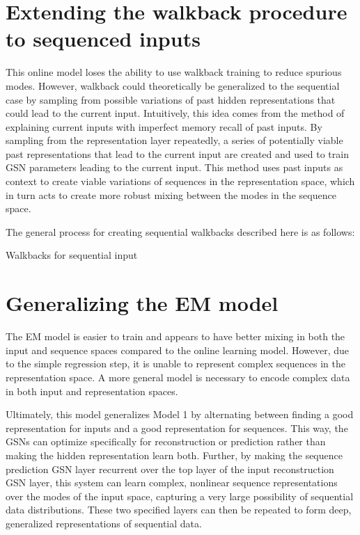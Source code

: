 \section{Extending the walkback procedure to sequenced inputs}

This online model loses the ability to use walkback training to reduce spurious modes. However, walkback could theoretically be generalized to the sequential case by sampling from possible variations of past hidden representations that could lead to the current input. Intuitively, this idea comes from the method of explaining current inputs with imperfect memory recall of past inputs. By sampling from the representation layer repeatedly, a series of potentially viable past representations that lead to the current input are created and used to train GSN parameters leading to the current input. This method uses past inputs as context to create viable variations of sequences in the representation space, which in turn acts to create more robust mixing between the modes in the sequence space.

The general process for creating sequential walkbacks described here is as follows:
\begin{algorithm}[h!]
	\caption{ Walkbacks for sequential input }
\end{algorithm}

\section{Generalizing the EM model}
The EM model is easier to train and appears to have better mixing in both the input and sequence spaces compared to the online learning model. However, due to the simple regression step, it is unable to represent complex sequences in the representation space. A more general model is necessary to encode complex data in both input and representation spaces.

Ultimately, this model generalizes Model 1 by alternating between finding a good representation for inputs and a good representation for sequences. This way, the GSNs can optimize specifically for reconstruction or prediction rather than making the hidden representation learn both. Further, by making the sequence prediction GSN layer recurrent over the top layer of the input reconstruction GSN layer, this system can learn complex, nonlinear sequence representations over the modes of the input space, capturing a very large possibility of sequential data distributions. These two specified layers can then be repeated to form deep, generalized representations of sequential data.


